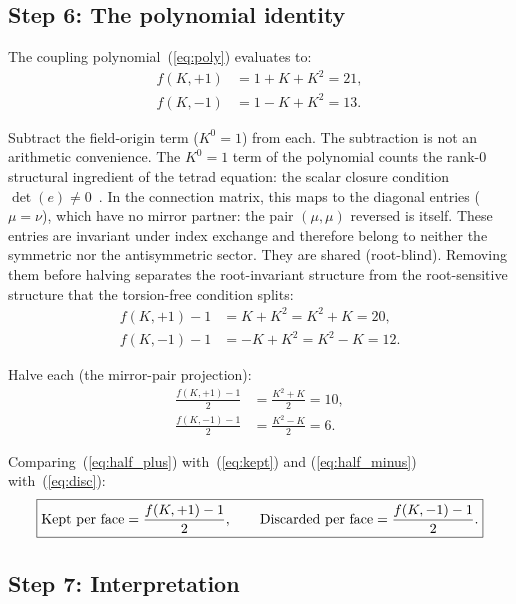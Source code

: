 \documentclass[11pt]{article}
\begin{document}
\subsection*{Step 6: The polynomial identity}

The coupling polynomial~(\ref{eq:poly}) evaluates to:
\begin{align}
  f(K, +1) &= 1 + K + K^2 = 21,
    \label{eq:f_plus} \\
  f(K, -1) &= 1 - K + K^2 = 13.
    \label{eq:f_minus}
\end{align}

Subtract the field-origin term ($K^0 = 1$) from each.  The
subtraction is not an arithmetic convenience.  The $K^0 = 1$
term of the polynomial counts the rank-0 structural ingredient
of the tetrad equation: the scalar closure condition
$\det(e) \neq 0$~\cite{Nelson2026b}.  In the connection
matrix, this maps to the diagonal entries ($\mu = \nu$), which
have no mirror partner: the pair $(\mu, \mu)$ reversed is
itself.  These entries are invariant under index exchange and
therefore belong to neither the symmetric nor the antisymmetric
sector.  They are shared (root-blind).  Removing them before
halving separates the root-invariant structure from the
root-sensitive structure that the torsion-free condition
splits:
\begin{align}
  f(K, +1) - 1 &= K + K^2 = K^2 + K = 20,
    \label{eq:fminus1_plus} \\
  f(K, -1) - 1 &= -K + K^2 = K^2 - K = 12.
    \label{eq:fminus1_minus}
\end{align}

Halve each (the mirror-pair projection):
\begin{align}
  \frac{f(K, +1) - 1}{2} &= \frac{K^2 + K}{2} = 10,
    \label{eq:half_plus} \\[6pt]
  \frac{f(K, -1) - 1}{2} &= \frac{K^2 - K}{2} = 6.
    \label{eq:half_minus}
\end{align}

Comparing~(\ref{eq:half_plus}) with~(\ref{eq:kept}) and
(\ref{eq:half_minus}) with~(\ref{eq:disc}):
\begin{equation}
  \boxed{%
  \text{Kept per face}
    = \frac{f(K,{+}1) - 1}{2}, \qquad
  \text{Discarded per face}
    = \frac{f(K,{-}1) - 1}{2}.}
  \label{eq:main}
\end{equation}

\subsection*{Step 7: Interpretation}
\end{document}
